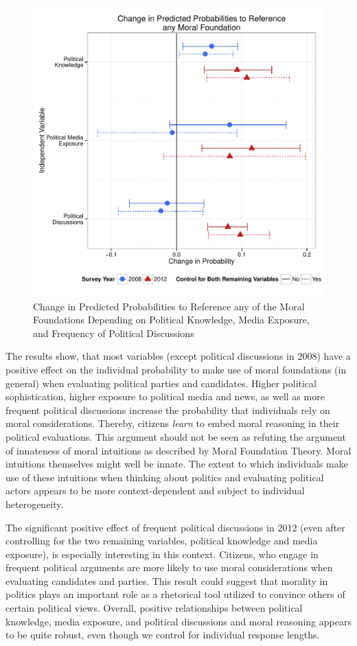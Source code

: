 \documentclass[12pt]{article}
\begin{document}
\begin{figure}\centering
\includegraphics[scale=.5]{../calc/fig/m3_learn.pdf}
\caption{Change in Predicted Probabilities to Reference any of the Moral Foundations Depending on Political Knowledge, Media Exposure, and Frequency of Political Discussions}\label{fig:m3_learn}
\end{figure}

The results show, that most variables (except political discussions in 2008) have a positive effect on the individual probability to make use of moral foundations (in general) when evaluating political parties and candidates. Higher political sophistication, higher exposure to political media and news, as well as more frequent political discussions increase the probability that individuals rely on moral considerations. Thereby, citizens \textit{learn} to embed moral reasoning in their political evaluations. This argument should not be seen as refuting the argument of innateness of moral intuitions as described by Moral Foundation Theory. Moral intuitions themselves might well be innate. The extent to which individuals make use of these intuitions when thinking about politics and evaluating political actors appears to be more context-dependent and subject to individual heterogeneity.

The significant positive effect of frequent political discussions in 2012 (even after controlling for the two remaining variables, political knowledge and media exposure), is especially interesting in this context. Citizens, who engage in frequent political arguments are more likely to use moral considerations when evaluating candidates and parties. This result could suggest that morality in politics plays an important role as a rhetorical tool utilized to convince others of certain political views. Overall, positive relationships between political knowledge, media exposure, and political discussions and moral reasoning appears to be quite robust, even though we control for individual response lengths.
\end{document}
